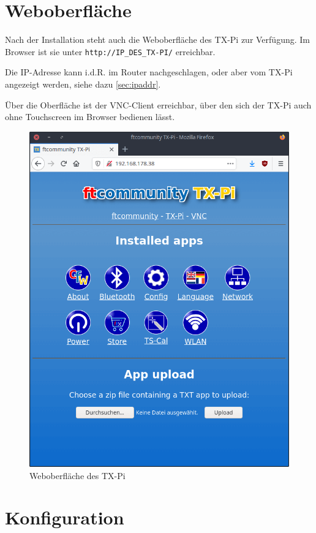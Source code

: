 \documentclass[
  paper=A4,
  ngerman,
  fontsize=12pt,
  parskip=half-,
]{scrbook}
\begin{document}
\chapter{Weboberfläche}

Nach der Installation steht auch die Weboberfläche des TX-Pi zur Verfügung.
Im Browser ist sie unter \texttt{http://IP\_DES\_TX-PI/} erreichbar.

Die IP-Adresse kann i.d.R. im Router nachgeschlagen, oder aber
vom TX-Pi angezeigt werden, siehe dazu \ref{sec:ipaddr}.

Über die Oberfläche ist der VNC-Client erreichbar, über den
sich der TX-Pi auch ohne Touchscreen im Browser bedienen lässt.

\begin{figure}[h]
\centering
\includegraphics[scale=0.35]{images/browser.png}
\caption{Weboberfläche des TX-Pi}
\end{figure}


\chapter{Konfiguration}
\label{chapter:config}
\end{document}
